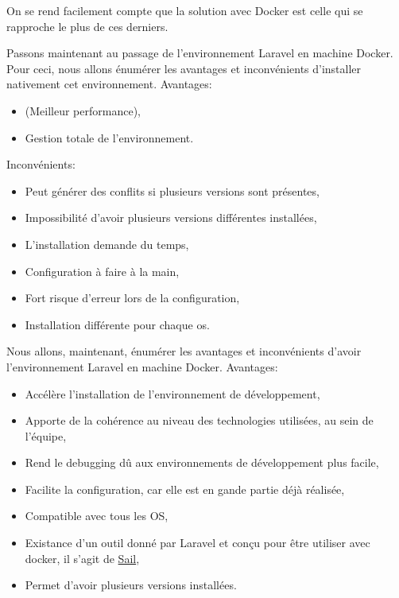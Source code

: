 \documentclass[
    iai, %
    il, %
]{heig-tb}
\begin{document}
On se rend facilement compte que la solution avec Docker est celle qui se rapproche le plus de ces derniers.

Passons maintenant au passage de l'environnement Laravel en machine Docker.
Pour ceci, nous allons énumérer les avantages et inconvénients d'installer nativement cet environnement.
Avantages:
\begin{itemize}
    \item (Meilleur performance),
    \item Gestion totale de l'environnement.
\end{itemize}

Inconvénients:
\begin{itemize}
    \item Peut générer des conflits si plusieurs versions sont présentes,
    \item Impossibilité d'avoir plusieurs versions différentes installées,
    \item L'installation demande du temps,
    \item Configuration à faire à la main,
    \item Fort risque d'erreur lors de la configuration,
    \item Installation différente pour chaque \Gls{os}.
\end{itemize}

Nous allons, maintenant, énumérer les avantages et inconvénients d'avoir l'environnement Laravel en machine Docker.
Avantages:
\begin{itemize}
    \item Accélère l'installation de l'environnement de développement, \cite{labrecque}
    \item Apporte de la cohérence au niveau des technologies utilisées, au sein de l'équipe, \cite{labrecque, data-flair_use_cases}
    \item Rend le debugging dû aux environnements de développement plus facile, \cite{labrecque,koukia}
    \item Facilite la configuration, car elle est en gande partie déjà réalisée, \cite{data-flair_pros_cons}
    \item Compatible avec tous les OS,
    \item Existance d'un outil donné par Laravel et conçu pour être utiliser avec \Gls{docker}, il s'agit de \href{https://laravel.com/docs/9.x/sail}{Sail},
    \item Permet d'avoir plusieurs versions installées.
\end{itemize}
\end{document}
